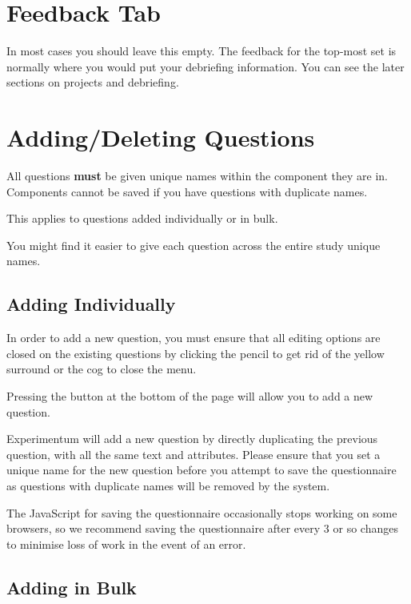 \documentclass[]{book}
\begin{document}
\section{Feedback Tab}\label{feedback-tab}

In most cases you should leave this empty. The feedback for the top-most
set is normally where you would put your debriefing information. You can
see the later sections on projects and debriefing.

\section{Adding/Deleting Questions}\label{addingdeleting-questions}

\begin{warning}
All questions \textbf{must} be given unique names within the component
they are in. Components cannot be saved if you have questions with
duplicate names.

This applies to questions added individually or in bulk.

You might find it easier to give each question across the entire study
unique names.
\end{warning}

\subsection{Adding Individually}\label{adding-individually}

In order to add a new question, you must ensure that all editing options
are closed on the existing questions by clicking the pencil to get rid
of the yellow surround or the cog to close the menu.

Pressing the button at the bottom of the page will allow you to add a
new question.

Experimentum will add a new question by directly duplicating the
previous question, with all the same text and attributes. Please ensure
that you set a unique name for the new question before you attempt to
save the questionnaire as questions with duplicate names will be removed
by the system.

\begin{danger}
The JavaScript for saving the questionnaire occasionally stops working
on some browsers, so we recommend saving the questionnaire after every 3
or so changes to minimise loss of work in the event of an error.
\end{danger}

\hypertarget{addfromspreadsheet}{\subsection{Adding in
Bulk}\label{addfromspreadsheet}}
\end{document}
